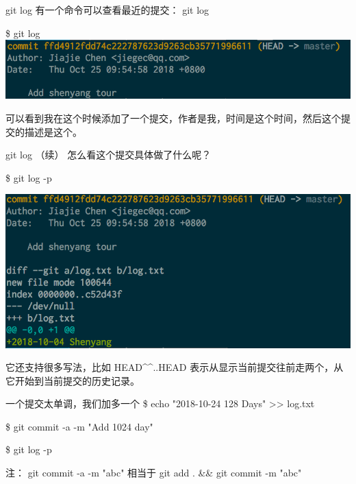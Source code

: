 \documentclass{beamer}
\begin{document}
\begin{frame}{git log}
    有一个命令可以查看最近的提交： git log

    \$ git log
    \includegraphics[width=\linewidth]{2018-10-25-09-59-01.png}

    可以看到我在这个时候添加了一个提交，作者是我，时间是这个时间，然后这个提交的描述是这个。

\end{frame}
\begin{frame}{git log （续）}
    怎么看这个提交具体做了什么呢？

    \$ git log -p

    \includegraphics[width=\linewidth]{2018-10-25-10-01-41.png}

    它还支持很多写法，比如 HEAD\^{}\^{}..HEAD 表示从显示当前提交往前走两个，从它开始到当前提交的历史记录。
\end{frame}

\begin{frame}{一个提交太单调，我们加多一个}
    \$ echo "2018-10-24 128 Days" >{}> log.txt

    \$ git commit -a -m "Add 1024 day"

    \$ git log -p

    注： git commit -a -m "abc" 相当于 git add . \&\& git commit -m "abc"

\end{frame}
\end{document}
